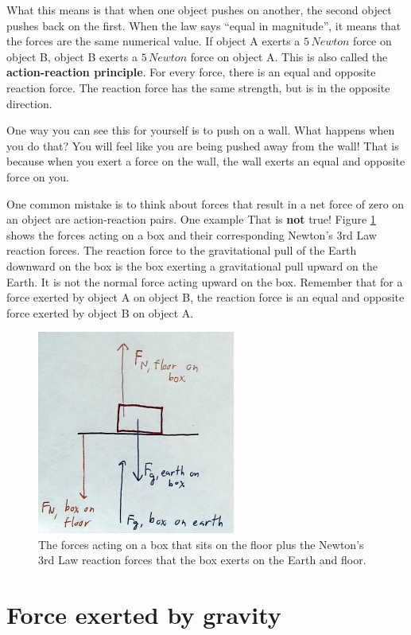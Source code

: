 \documentclass[12pt]{book}
\begin{document}
\linespace

What this means is that when one object pushes on another, the second object pushes back on the first. When the law says ``equal in magnitude'', it means that the forces are the same numerical value. If object A exerts a $5 \, Newton$ force on object B, object B exerts a $5 \, Newton$ force on object A. This is also called the \textbf{action-reaction principle}. For every force, there is an equal and opposite reaction force. The reaction force has the same strength, but is in the opposite direction.

One way you can see this for yourself is to push on a wall. What happens when you do that? You will feel like you are being pushed away from the wall! That is because when you exert a force on the wall, the wall exerts an equal and opposite force on you. 

One common mistake is to think about forces that result in a net force of zero on an object are action-reaction pairs. One example That is \textbf{not} true! Figure \ref{box3rd} shows the forces acting on a box and their corresponding Newton's 3rd Law reaction forces. The reaction force to the gravitational pull of the Earth downward on the box is the box exerting a gravitational pull upward on the Earth. It is not the normal force acting upward on the box. Remember that for a force exerted by object A on object B, the reaction force is an equal and opposite force exerted by object B on object A.

\begin{figure}[H]
\centering
\includegraphics[scale=1.0]{newtons3rd.png}
\caption{The forces acting on a box that sits on the floor plus the Newton's 3rd Law reaction forces that the box exerts on the Earth and floor.}
\label{box3rd}
\end{figure}

\section{Force exerted by gravity}
\end{document}

